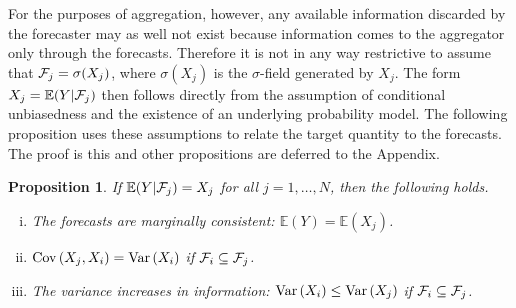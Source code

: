 \documentclass[11pt]{article}
\newcommand{\E}{\mathbb{E}}
\newtheorem{proposition}[theorem]{Proposition}
\theoremstyle{definition}
\theoremstyle{definition}
\def\F{{\cal F}}
\def\E{{\mathbb E}}
\def\Var{{\rm Var}\,}
\def\Cov{{\rm Cov}\,}
\def\|{\, | \,}
\begin{document}
 For the purposes of aggregation, however, any available information discarded by the forecaster may as well not exist because  information comes to the aggregator only through the forecasts. Therefore it is not in any way restrictive to assume that $\F_j = \sigma(X_j)$, where $\sigma(X_j)$ is the $\sigma$-field generated by $X_j$. The form $X_j = \E(Y | \F_j)$ then follows directly from the assumption of conditional unbiasedness and  the existence of an underlying probability model. %
  The following proposition uses these assumptions to relate the target quantity to the forecasts. The proof is this and other propositions are deferred to the Appendix.
 \begin{proposition}
\label{covstr}
If $\E(Y|\F_j)  = X_j$ for all $j =1, \dots, N$, then the following holds.
\begin{enumerate}[i)] 
\item The forecasts are marginally consistent: $\E(Y) = \E(X_j)$. \label{first}
\item $\Cov(X_j, X_i) = \Var(X_i)$ if $\F_i \subseteq \F_j$.
   \label{second}
\item The variance increases in information: $\Var(X_i) \leq \Var(X_j)$ if $\F_i \subseteq \F_j$.  \label{third}
\end{enumerate}
\end{proposition}
\end{document}

